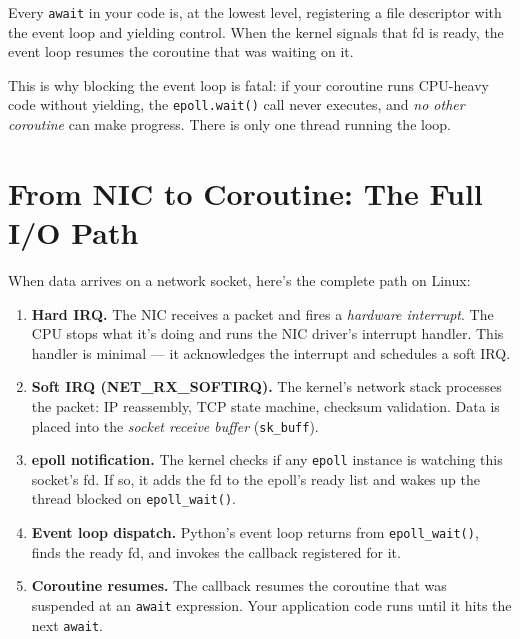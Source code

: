 \documentclass[11pt,a4paper,oneside]{book}
\newcommand{\py}[1]{\texttt{\color{pyblue}#1}}
\begin{document}
Every \py{await} in your code is, at the lowest level, registering a file descriptor with the
event loop and yielding control. When the kernel signals that fd is ready, the event loop
resumes the coroutine that was waiting on it.

\begin{warningbox}
This is why blocking the event loop is fatal: if your coroutine runs CPU-heavy code
without yielding, the \texttt{epoll.wait()} call never executes, and \emph{no other
coroutine} can make progress. There is only one thread running the loop.
\end{warningbox}

\section{From NIC to Coroutine: The Full I/O Path}

When data arrives on a network socket, here's the complete path on Linux:

\begin{enumerate}
    \item \textbf{Hard IRQ.} The NIC receives a packet and fires a \emph{hardware interrupt}.
          The CPU stops what it's doing and runs the NIC driver's interrupt handler. This
          handler is minimal --- it acknowledges the interrupt and schedules a soft IRQ.
    \item \textbf{Soft IRQ (NET\_RX\_SOFTIRQ).} The kernel's network stack processes the packet:
          IP reassembly, TCP state machine, checksum validation. Data is placed into the
          \emph{socket receive buffer} (\texttt{sk\_buff}).
    \item \textbf{epoll notification.} The kernel checks if any \texttt{epoll} instance is watching
          this socket's fd. If so, it adds the fd to the epoll's ready list and wakes up the thread
          blocked on \texttt{epoll\_wait()}.
    \item \textbf{Event loop dispatch.} Python's event loop returns from \texttt{epoll\_wait()},
          finds the ready fd, and invokes the callback registered for it.
    \item \textbf{Coroutine resumes.} The callback resumes the coroutine that was suspended at
          an \py{await} expression. Your application code runs until it hits the next \py{await}.
\end{enumerate}
\end{document}
